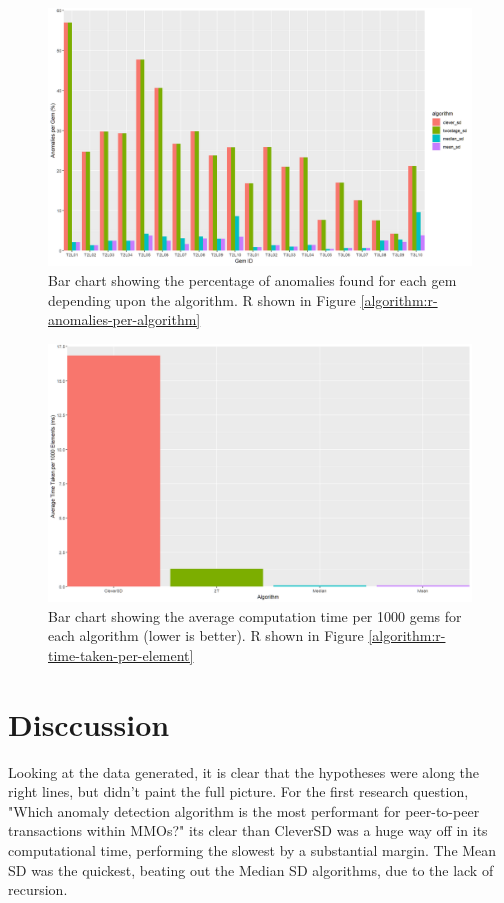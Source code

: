 \documentclass[journal]{IEEEtran}
\begin{document}
\begin{figure}[!htbp]
    \centering
    \includegraphics[width=12cm]{graph-anomalies-per-algorithm.png}
    \caption{Bar chart showing the percentage of anomalies found for each gem depending upon the algorithm. R shown in Figure \ref{algorithm:r-anomalies-per-algorithm}}
    \label{graph:anomalies-per-algorithm}
\end{figure}

\begin{figure}[!htbp]
    \centering
    \includegraphics[width=12cm]{graph-compute-time-per-algorithm.png}
    \caption{Bar chart showing the average computation time per 1000 gems for each algorithm (lower is better). R shown in Figure \ref{algorithm:r-time-taken-per-element}}
    \label{graph:time-taken-per-algorithm}
\end{figure}

\section{Disccussion}
\noindent Looking at the data generated, it is clear that the hypotheses were along the right lines, but didn't paint the full picture. For the first research question, "Which anomaly detection algorithm is the most performant for peer-to-peer transactions within MMOs?" its clear than CleverSD was a huge way off in its computational time, performing the slowest by a substantial margin. The Mean SD was the quickest, beating out the Median SD algorithms, due to the lack of recursion.
\end{document}
